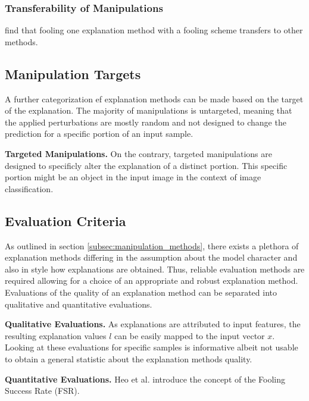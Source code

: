 \subsubsection{Transferability of Manipulations}
\cite{fooling_nn_interpreters} find that fooling one explanation method with a fooling scheme transfers to other methods. 


\subsection{Manipulation Targets}
\label{subsec:manipulation_targets}
A further categorization ef explanation methods can be made based on the target of the explanation. 
The majority of manipulations is untargeted, meaning that the applied perturbations are mostly random and not designed to change the prediction for a specific portion of an input sample. 

\noindent\textbf{Targeted Manipulations.} 
On the contrary, targeted manipulations are designed to specificly alter the explanation of a distinct portion. This specific portion might be an object in the input image in the context of image classification. 





\subsection{Evaluation Criteria}
\label{subsec:evaluation_criteria}
As outlined in section \autoref{subsec:manipulation_methods}, there exists a plethora of explanation methods differing in the assumption about the model character and also in style how explanations are obtained. Thus, reliable evaluation methods are required allowing for a choice of an appropriate and robust explanation method. 
Evaluations of the quality of an explanation method can be separated into qualitative and quantitative evaluations. 

\noindent\textbf{Qualitative Evaluations.} 
As explanations are attributed to input features, the resulting explanation values $l$ can be easily mapped to the input vector $x$.
Looking at these evaluations for specific samples is informative albeit not usable to obtain a general statistic about the explanation methods quality.


\noindent\textbf{Quantitative Evaluations.} 
Heo et al. \cite{fooling_nn_interpreters} introduce the concept of the Fooling Success Rate (FSR). 
